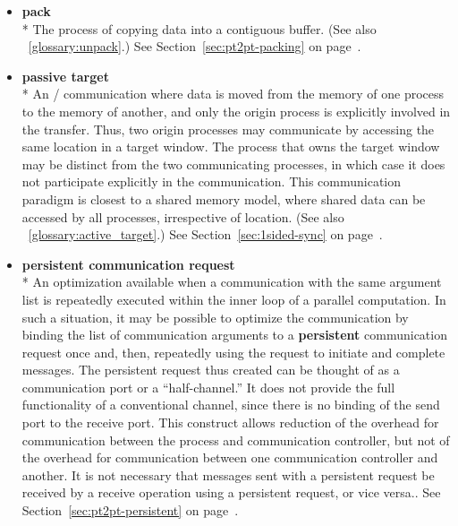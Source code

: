\begin{itemize}
\label{glossary:pack}
\item \textbf{ pack} \\*
The process of copying data into a contiguous buffer.
(See also ~\ref{glossary:unpack}.)
See Section~\ref{sec:pt2pt-packing} on page~\pageref{sec:pt2pt-packing}.

\label{glossary:passive_target}
\item \textbf{ passive target} \\*
An \RMA/ communication where data is moved from the memory of one
process to the memory of another, and only the origin process is
explicitly involved
in
the transfer.  Thus, two origin processes may communicate by accessing
the same location in a target window.  The process that owns the
target window may be distinct from the two communicating processes, 
in which case it does not participate explicitly in the communication.
This communication
paradigm is closest to a shared memory model, where shared data can be
accessed by all processes, irrespective 
of location. (See also ~\ref{glossary:active_target}.)
See Section~\ref{sec:1sided-sync} on page~\pageref{sec:1sided-sync}.

\label{glossary:persistent_communication_request}
\item \textbf{ persistent communication request} \\*
An optimization available when a communication with the same argument list is repeatedly
executed within the inner loop of a parallel computation.  In such a
situation, it may be possible to optimize the communication by
binding the list of communication arguments to a {\bf persistent} communication
request once and, then, repeatedly using
the request to initiate and complete messages.  The
persistent request thus created can be thought of as a
communication port or a ``half-channel.''
It does not provide the full functionality of a conventional channel,
since there is no binding of the send port to the receive port. This
construct allows reduction of the overhead for communication
between the process and communication controller, but not of the overhead for
communication between one communication controller and another.
It is not necessary that messages sent with a persistent request be received
by a receive operation using a persistent request, or vice versa..
See Section~\ref{sec:pt2pt-persistent} on page~\pageref{sec:pt2pt-persistent}.


\end{itemize}
